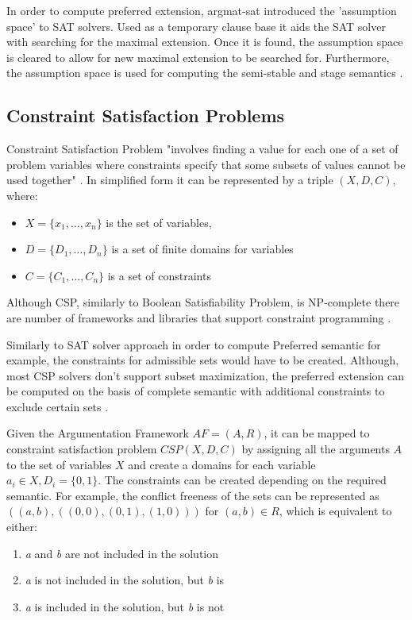 In order to compute preferred extension, argmat-sat introduced the 'assumption space' to SAT solvers. Used as a temporary clause base it aids the SAT solver with searching for the maximal extension. Once it is found, the assumption space is cleared to allow for new maximal extension to be searched for. Furthermore, the assumption space is used for computing the semi-stable and stage semantics \citep{argmatSat}.


\subsection{Constraint Satisfaction Problems}
Constraint Satisfaction Problem "involves finding a value for each one of a set of problem variables where constraints specify that some subsets of values cannot be used together" \citep{csp1}. In simplified form it can be represented by a triple $(X, D, C)$, where:
\begin{itemize}
	\item $X = \{x_1, \ldots, x_n\} $ is the set of variables,
	\item $ D = \{D_1, \ldots, D_n \} $ is a set of finite domains for variables
	\item $ C = \{ C_1, \ldots, C_n \} $ is a set of constraints
\end{itemize}
Although CSP, similarly to Boolean Satisfiability Problem, is NP-complete there are number of frameworks and libraries that support constraint programming \citep{solvingMethods}.

Similarly to SAT solver approach in order to compute Preferred semantic for example, the constraints for admissible sets would have to be created. Although, most CSP solvers don't support subset maximization, the preferred extension can be computed on the basis of complete semantic with additional constraints to exclude certain sets \citep{solvingMethods}.

Given the Argumentation Framework $ AF = (A,R)$, it can be mapped to constraint satisfaction problem $ CSP(X,D,C) $ by assigning all the arguments $A$ to the set of variables $X$ and create a domains for each variable $ a_i \in X, D_i = \{0,1\} $. The constraints can be created depending on the required semantic. For example, the conflict freeness of the sets can be represented as $((a,b),((0,0), (0,1),(1,0)))$ for $(a,b) \in R$, which is equivalent to either:
\begin{enumerate}
	\item \textit{a} and \textit{b} are not included in the solution
	\item \textit{a} is not included in the solution, but \textit{b} is
	\item \textit{a} is included in the solution, but \textit{b} is not
\end{enumerate}


